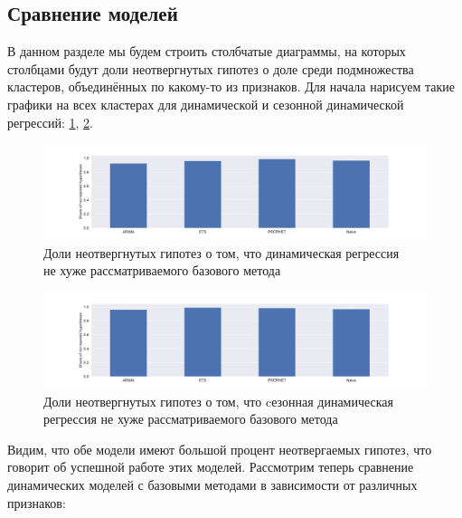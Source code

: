 \documentclass[a4paper,14pt]{extarticle}
\begin{document}
	\subsection{Сравнение моделей}
	В данном разделе мы будем строить столбчатые диаграммы, на которых столбцами будут доли неотвергнутых гипотез о доле среди подмножества кластеров, объединённых по какому-то из признаков. Для начала нарисуем такие графики на всех кластерах для динамической и сезонной динамической регрессий: \ref{results:dynreg:full}, \ref{results:seasdynreg:full}. 
	\begin{figure}[!h]
		\captionsetup{justification=centering}
		\centering
		\includegraphics[width=\linewidth]{pictures/results-dynreg-full.pdf}
		\caption{Доли неотвергнутых гипотез о том, что динамическая регрессия \\ не хуже рассматриваемого базового метода}
		\label{results:dynreg:full}
	\end{figure}
	\begin{figure}[!h]
		\captionsetup{justification=centering}
		\centering
		\includegraphics[width=\linewidth]{pictures/results-seasdynreg-full.pdf}
		\caption{Доли неотвергнутых гипотез о том, что cезонная динамическая регрессия не хуже рассматриваемого базового метода}
		\label{results:seasdynreg:full}
	\end{figure}
	Видим, что обе модели имеют большой процент неотвергаемых гипотез, что говорит об успешной работе этих моделей. Рассмотрим теперь сравнение динамических моделей с базовыми методами в зависимости от различных признаков:
\end{document}
